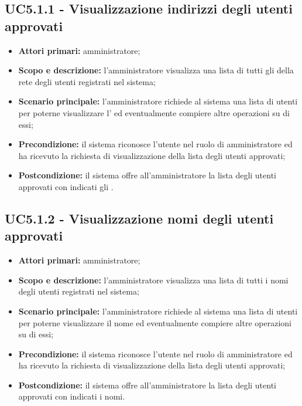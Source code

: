 \documentclass[AnalisiDeiRequisiti.tex]{subfiles}
\begin{document}
\subsection{UC5.1.1 - Visualizzazione indirizzi degli utenti approvati}
\begin{itemize}
	\item \textbf{Attori primari:} amministratore;
	\item \textbf{Scopo e descrizione:} l'amministratore visualizza una lista di tutti gli  della rete  degli utenti registrati nel sistema;
	\item \textbf{Scenario principale:} l'amministratore richiede al sistema una lista di utenti per poterne visualizzare l' ed eventualmente compiere altre operazioni su di essi;
	\item \textbf{Precondizione:} il sistema riconosce l'utente nel ruolo di amministratore ed ha ricevuto la richiesta di visualizzazione della lista degli utenti approvati;
	\item \textbf{Postcondizione:} il sistema offre all'amministratore la lista degli utenti approvati con indicati gli .
\end{itemize}
\subsection{UC5.1.2 - Visualizzazione nomi degli utenti approvati}
\begin{itemize}
	\item \textbf{Attori primari:} amministratore;
	\item \textbf{Scopo e descrizione:} l'amministratore visualizza una lista di tutti i nomi degli utenti registrati nel sistema;
	\item \textbf{Scenario principale:} l'amministratore richiede al sistema una lista di utenti per poterne visualizzare il nome ed eventualmente compiere altre operazioni su di essi;
	\item \textbf{Precondizione:} il sistema riconosce l'utente nel ruolo di amministratore ed ha ricevuto la richiesta di visualizzazione della lista degli utenti approvati;
	\item \textbf{Postcondizione:} il sistema offre all'amministratore la lista degli utenti approvati con indicati i nomi.
\end{itemize}
\end{document}
